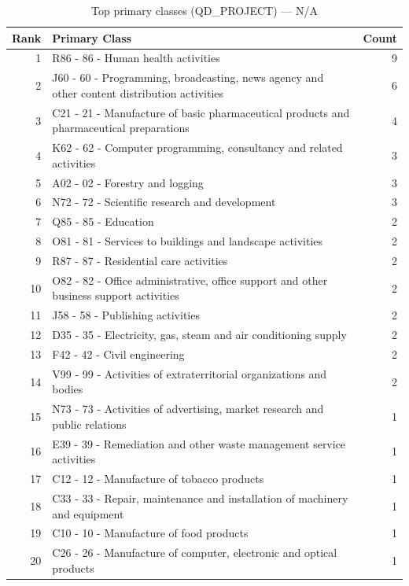 \begin{table}[H]
    \centering
    \begin{tabular}{r p{10cm} r}
    \hline
    \textbf{Rank} & \textbf{Primary Class} & \textbf{Count} \\
    \hline
    1 & R86 - 86 - Human health activities & 9 \\
    2 & J60 - 60 - Programming, broadcasting, news agency and other content distribution activities & 6 \\
    3 & C21 - 21 - Manufacture of basic pharmaceutical products and pharmaceutical preparations & 4 \\
    4 & K62 - 62 - Computer programming, consultancy and related activities & 3 \\
    5 & A02 - 02 - Forestry and logging & 3 \\
    6 & N72 - 72 - Scientific research and development & 3 \\
    7 & Q85 - 85 - Education & 2 \\
    8 & O81 - 81 - Services to buildings and landscape activities & 2 \\
    9 & R87 - 87 - Residential care activities & 2 \\
    10 & O82 - 82 - Office administrative, office support and other business support activities & 2 \\
    11 & J58 - 58 - Publishing activities & 2 \\
    12 & D35 - 35 - Electricity, gas, steam and air conditioning supply & 2 \\
    13 & F42 - 42 - Civil engineering & 2 \\
    14 & V99 - 99 - Activities of extraterritorial organizations and bodies & 2 \\
    15 & N73 - 73 - Activities of advertising, market research and public relations & 1 \\
    16 & E39 - 39 - Remediation and other waste management service activities & 1 \\
    17 & C12 - 12 - Manufacture of tobacco products & 1 \\
    18 & C33 - 33 - Repair, maintenance and installation of machinery and equipment & 1 \\
    19 & C10 - 10 - Manufacture of food products & 1 \\
    20 & C26 - 26 - Manufacture of computer, electronic and optical products & 1 \\
    \hline
    \end{tabular}
    \caption{Top primary classes (QD\_PROJECT) --- N/A}
\end{table}

